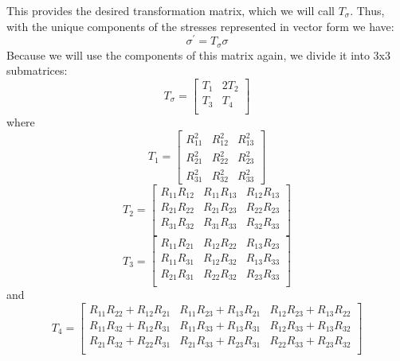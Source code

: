 \documentclass{article}
\begin{document}
This provides the desired transformation matrix, which we will call $T_\sigma$.  Thus, with the unique components of the stresses represented in vector form we have:
\begin{equation}
\sigma^\prime = T_\sigma \sigma
\end{equation}
Because we will use the components of this matrix again, we divide it into 3x3 submatrices:
\begin{equation}
T_\sigma =
\begin{bmatrix}
    T_1 & 2 T_2 \\
    T_3 & T_4 \\
\end{bmatrix}
\end{equation}
where
\begin{equation}
T_1 = \begin{bmatrix}
    R_{11}^2 & R_{12}^2 & R_{13}^2 \\
    R_{21}^2 & R_{22}^2 & R_{23}^2 \\
    R_{31}^2 & R_{32}^2 & R_{33}^2
\end{bmatrix}
\end{equation}
\begin{equation}
T_2 = \begin{bmatrix}
    R_{11}R_{12} & R_{11}R_{13} & R_{12}R_{13} \\
    R_{21}R_{22} & R_{21}R_{23} & R_{22}R_{23} \\
    R_{31}R_{32} & R_{31}R_{33} & R_{32}R_{33} \\
\end{bmatrix}
\end{equation}
\begin{equation}
T_3 = \begin{bmatrix}
    R_{11}R_{21} & R_{12}R_{22} & R_{13}R_{23} \\
    R_{11}R_{31} & R_{12}R_{32} & R_{13}R_{33} \\
    R_{21}R_{31} & R_{22}R_{32} & R_{23}R_{33} \\
\end{bmatrix}
\end{equation}
and
\begin{equation}
T_4 = \begin{bmatrix}
    R_{11}R_{22} + R_{12}R_{21} & R_{11}R_{23} + R_{13}R_{21} & R_{12}R_{23} + R_{13}R_{22} \\
    R_{11}R_{32} + R_{12}R_{31} & R_{11}R_{33} + R_{13}R_{31} & R_{12}R_{33} + R_{13}R_{32} \\
    R_{21}R_{32} + R_{22}R_{31} & R_{21}R_{33} + R_{23}R_{31} & R_{22}R_{33} + R_{23}R_{32} \\
\end{bmatrix}
\end{equation}
\end{document}

